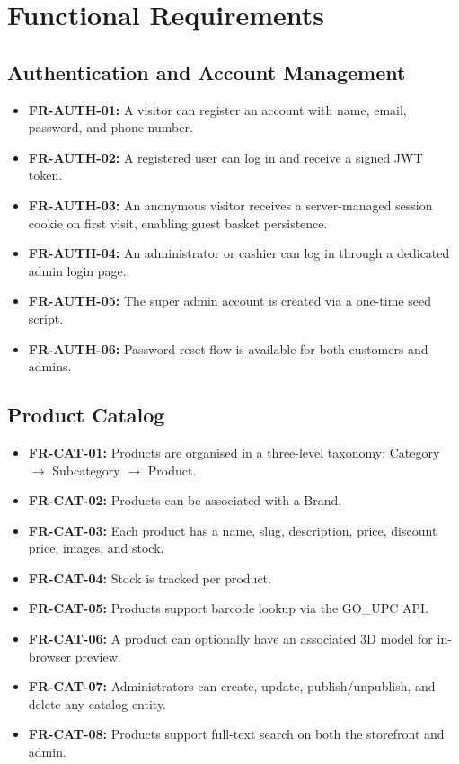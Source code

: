 \section{Functional Requirements}

\subsection{Authentication and Account Management}

\begin{itemize}
    \item \textbf{FR-AUTH-01:} A visitor can register an account with name, email, password, and phone number.
    \item \textbf{FR-AUTH-02:} A registered user can log in and receive a signed JWT token.
    \item \textbf{FR-AUTH-03:} An anonymous visitor receives a server-managed session cookie on first visit, enabling guest basket persistence.
    \item \textbf{FR-AUTH-04:} An administrator or cashier can log in through a dedicated admin login page.
    \item \textbf{FR-AUTH-05:} The super admin account is created via a one-time seed script.
    \item \textbf{FR-AUTH-06:} Password reset flow is available for both customers and admins.
\end{itemize}

\subsection{Product Catalog}

\begin{itemize}
    \item \textbf{FR-CAT-01:} Products are organised in a three-level taxonomy: Category $\rightarrow$ Subcategory $\rightarrow$ Product.
    \item \textbf{FR-CAT-02:} Products can be associated with a Brand.
    \item \textbf{FR-CAT-03:} Each product has a name, slug, description, price, discount price, images, and stock.
    \item \textbf{FR-CAT-04:} Stock is tracked per product.
    \item \textbf{FR-CAT-05:} Products support barcode lookup via the GO\_UPC API.
    \item \textbf{FR-CAT-06:} A product can optionally have an associated 3D model for in-browser preview.
    \item \textbf{FR-CAT-07:} Administrators can create, update, publish/unpublish, and delete any catalog entity.
    \item \textbf{FR-CAT-08:} Products support full-text search on both the storefront and admin.
\end{itemize}

